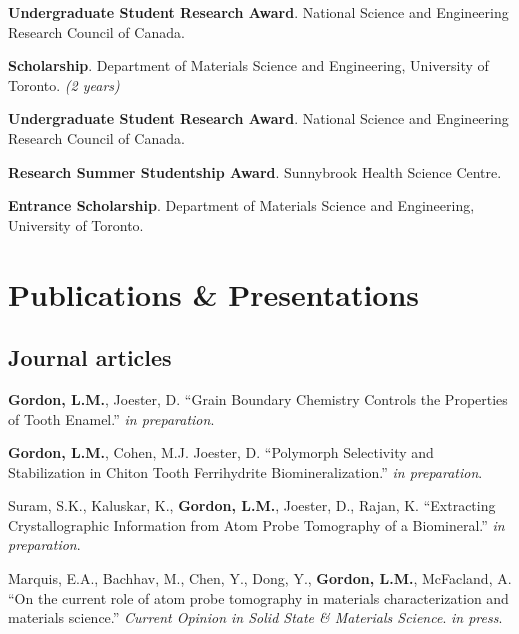\textbf{Undergraduate Student Research Award}. National Science and Engineering Research Council of Canada. 

\textbf{Scholarship}. Department of Materials Science and Engineering, University of Toronto. \emph{(2 years)}

\textbf{Undergraduate Student Research Award}. National Science and Engineering Research Council of Canada. 

\textbf{Research Summer Studentship Award}. Sunnybrook Health Science Centre.

\textbf{Entrance Scholarship}. Department of Materials Science and Engineering, University of Toronto.
\endgroup

\section*{Publications \& Presentations}



\subsection*{Journal articles}
\textbf{Gordon, L.M.}, Joester, D. “Grain Boundary Chemistry Controls the Properties of Tooth Enamel.” \emph{in preparation}.

\begingroup\setlength{\parskip}{0.15cm}
\textbf{Gordon, L.M.}, Cohen, M.J. Joester, D. “Polymorph Selectivity and Stabilization in Chiton Tooth Ferrihydrite Biomineralization.” \emph{in preparation}.

Suram, S.K., Kaluskar, K., \textbf{Gordon, L.M.}, Joester, D., Rajan, K. “Extracting Crystallographic Information from Atom Probe Tomography of a Biomineral.” \emph{in preparation}.

Marquis, E.A., Bachhav, M., Chen, Y., Dong, Y., \textbf{Gordon, L.M.}, McFacland, A. ``On the current role of atom probe tomography in materials characterization and materials science.'' \emph{Current Opinion in Solid State \& Materials Science}. \emph{in press}.

